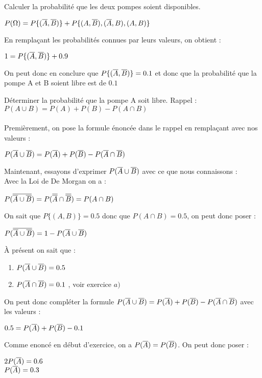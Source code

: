 \begin{exo}
\begin{subexo}{Calculer la probabilité que les deux pompes soient disponibles.}
    \begin{center}$P(\Omega) = P\{(\overline{A},\overline{B})\} + P\{(A,\overline{B}),(\overline{A},B),(A,B)\}$\end{center}
    En remplaçant les probabilités connues par leurs valeurs, on obtient :
    \begin{center}$1 = P\{(\overline{A},\overline{B})\} + 0.9$\end{center}
    On peut donc en conclure que $P\{(\overline{A},\overline{B})\}  = 0.1$ et donc que la probabilité que la pompe A et B soient libre est de $0.1$
  \end{subexo}
\begin{subexo}{Déterminer la probabilité que la pompe A soit libre.}
  Rappel : $P(A\cup B) = P(A) + P(B) - P(A \cap B)$ \\ \\
  Premièrement, on pose la formule énoncée dans le rappel en remplaçant avec nos valeurs :
  \begin{center}$P(\overline{A}\cup \overline{B}) = P(\overline{A}) + P(\overline{B}) - P(\overline{A} \cap \overline{B})$\end{center}
  Maintenant, essayons d'exprimer $P(\overline{A}\cup \overline{B})$ avec ce que nous connaissons : \\
  Avec la Loi de De Morgan on a :
  \begin{center}$P(\overline{\overline{A}\cup \overline{B}}) = P(\overline{\overline{A}} \cap \overline{\overline{B}}) = P(A \cap B)$\end{center}
  On sait que $P\{(A,B)\}=0.5$ donc que $P(A \cap B)=0.5$, on peut donc poser :
  \begin{center}$P(\overline{\overline{A}\cup \overline{B}}) = 1 - P(\overline{A} \cup \overline{B})$\end{center}
  À présent on sait que :
  \begin{enumerate}
    \item[ ] $P(\overline{A} \cup \overline{B}) = 0.5$
    \item[ ] $P(\overline{A} \cap \overline{B}) = 0.1$ , voir exercice $a)$
  \end{enumerate}
  On peut donc compléter la formule $P(\overline{A}\cup \overline{B}) = P(\overline{A}) + P(\overline{B}) - P(\overline{A} \cap \overline{B})$ avec les valeurs :
  \begin{center}
    $0.5 = P(\overline{A}) + P(\overline{B}) - 0.1$
  \end{center}
  Comme enoncé en début d'exercice, on a $P(\overline{A}) = P(\overline{B})$. On peut donc poser :
  \begin{center}
    $2P(\overline{A}) = 0.6$ \\ $P(\overline{A}) = 0.3$

\end{center}
\end{subexo}
\end{exo}
